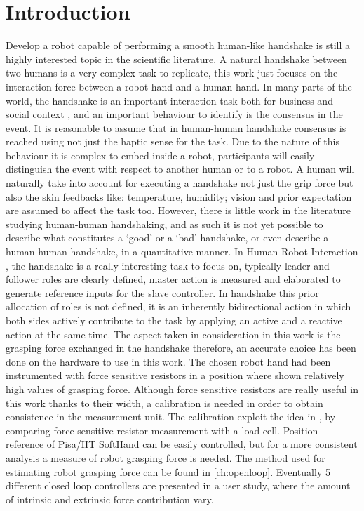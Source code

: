 \chapter*{Introduction}
Develop a robot capable of performing a smooth human-like handshake is still a highly interested topic in the scientific literature.
A natural handshake between two humans is a very complex task to replicate, this work just focuses on the interaction force between a robot hand and a human hand.
In many parts of the world, the handshake is an important interaction task both for business and social context \cite{chaplin2000handshaking}, and an important behaviour to identify is the consensus in the event. It is reasonable to assume that in human-human handshake consensus is reached using not just the haptic sense for the task. Due to the nature of this behaviour it is complex to embed inside a robot, participants will easily distinguish the event with respect to another human or to a robot. A human will naturally take into account for executing a handshake not just the grip force but also the skin feedbacks like: temperature, humidity; vision and prior expectation are assumed to affect the task too. However, there is little work in the literature studying human-human handshaking, and as such it is not yet possible to describe what constitutes a ‘good’ or a ‘bad’ handshake, or even describe a human-human handshake, in a quantitative manner.
In Human Robot Interaction \cite{sheridan2016human}, the handshake is a really interesting task to focus on, typically leader and follower roles are clearly defined, master action is measured and elaborated to generate reference inputs for the slave controller. In handshake this prior allocation of roles is not defined, it is an inherently bidirectional action in which both sides actively contribute to the task by applying an active and a reactive action at the same time.
The aspect taken in consideration in this work is the grasping force exchanged in the handshake therefore, an accurate choice has been done on the hardware to use in this work.
The chosen robot hand had been instrumented with force sensitive resistors in a position where \cite{knoop2017handshakiness} shown relatively high values of grasping force.
Although force sensitive resistors are really useful in this work thanks to their width, a calibration is needed in order to obtain consistence in the measurement unit. The calibration exploit the idea in \cite{calibFSR}, by comparing force sensitive resistor measurement with a load cell.
Position reference of Pisa/IIT SoftHand can be easily controlled, but for a more consistent analysis a measure of robot grasping force is needed. The method used for estimating robot grasping force can be found in \ref{ch:openloop}. Eventually 5 different closed loop controllers are presented in a user study, where the amount of intrinsic and extrinsic force contribution vary. 

